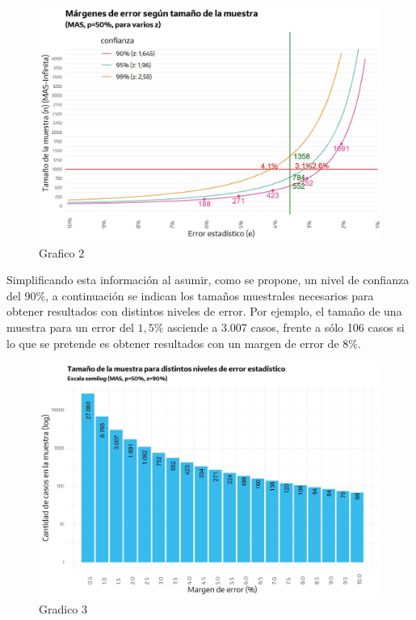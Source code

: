 \documentclass[
]{book}
\begin{document}
\begin{figure}
\includegraphics[width=1\linewidth]{imagenes/DT4_grafico2} \caption{Grafico 2}\label{fig:Margenesdeerrorseguntamaño}
\end{figure}

Simplificando esta información al asumir, como se propone, un nivel de confianza del \(90\%\), a continuación se indican los tamaños muestrales necesarios para obtener resultados con distintos niveles de error. Por ejemplo, el tamaño de una muestra para un error del \(1,5\%\) asciende a 3.007 casos, frente a sólo 106 casos si lo que se pretende es obtener resultados con un margen de error de \(8\%\).

\begin{figure}
\includegraphics[width=1\linewidth]{imagenes/DT4_grafico3} \caption{Gradico 3}\label{fig:Tamañodelamuestra}
\end{figure}
\end{document}
